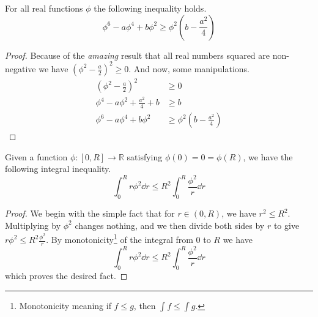\begin{lemma}\label{lem:ineq1}
    For all real functions \(\phi\) the following inequality holds.
    \begin{equation}
        \phi^6 - a\phi^4 + b\phi^2 \geq \phi^2\left(b - \frac{a^2}{4}\right)
    \end{equation}
\end{lemma}
\begin{proof}
    Because of the \textit{amazing} result that all real numbers squared are
    non-negative we have \(\left(\phi^2 - \frac{a}{2}\right)^2\geq 0\). And now,
    some manipulations.
    \begin{align*}
         \left(\phi^2 - \frac{a}{2}\right)^2 & \geq 0 \\
        \phi^4 - a\phi^2 + \frac{a^2}{4} + b & \geq b \\
                  \phi^6 - a\phi^4 + b\phi^2 & \geq \phi^2\left(b - \frac{a^2}{4}\right)
    \end{align*}
\end{proof}
\begin{lemma}\label{lem:ineq2}
    Given a function \(\phi:[0,R]\to \mathbb{R}\) satisfying \(\phi(0) = 0 = \phi(R)\), we have the following integral inequality.
    \begin{equation}
        \int_0^R r\phi^2\dd{r}\leq R^2\int_0^R\frac{\phi^2}{r}\dd{r}
    \end{equation}
\end{lemma}
\begin{proof}
    We begin with the simple fact that for \(r\in(0,R)\), we have
    \(r^2\leq R^2\). Multiplying by \(\phi^2\) changes nothing, and we then
    divide both sides by \(r\) to give \(r\phi^2\leq R^2\frac{\phi^2}{r}\). By
    monotonicity\footnote{Monotonicity meaning if \(f\leq g\), then
    \(\int f\leq \int g\).} of the integral from \(0\) to \(R\) we have
    \begin{equation}
        \int_0^R r\phi^2\dd{r}\leq R^2\int_0^R\frac{\phi^2}{r}\dd{r}
    \end{equation}
    which proves the desired fact.
\end{proof}

